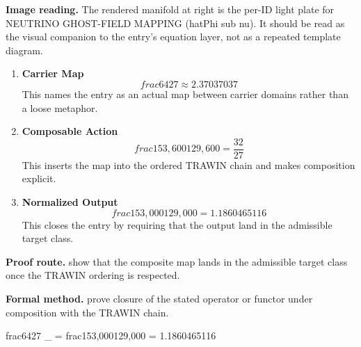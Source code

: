\begin{samepage}
\noindent\begin{minipage}[t]{0.45\linewidth}
\vspace{0pt}
\raggedright
\scriptsize\textbf{Image reading.} The rendered manifold at right is the per-ID light plate for NEUTRINO GHOST-FIELD MAPPING (hatPhi sub nu). It should be read as the visual companion to the entry's equation layer, not as a repeated template diagram.\par
\end{minipage}\hfill
\begin{minipage}[t]{0.53\linewidth}
\vspace*{-0.10in}
\raggedright
{}
\end{minipage}
\end{samepage}

\clearpage


\begin{enumerate}[leftmargin=1.6em,itemsep=9pt,topsep=6pt]
\item \textbf{Carrier Map}
\[
frac{64}{27} \approx 2.37037037
\]
This names the entry as an actual map between carrier domains rather than a loose metaphor.

\item \textbf{Composable Action}
\[
frac{153{,}600}{129{,}600} = \frac{32}{27}
\]
This inserts the map into the ordered TRAWIN chain and makes composition explicit.

\item \textbf{Normalized Output}
\[
frac{153{,}000}{129{,}000} = 1.1860465116
\]
This closes the entry by requiring that the output land in the admissible target class.
\end{enumerate}

\textbf{Proof route.} show that the composite map lands in the admissible target class once the TRAWIN ordering is respected.

\textbf{Formal method.} prove closure of the stated operator or functor under composition with the TRAWIN chain.

\medskip
{}

\begin{tzpsnapshot}
\end{tzpsnapshot}

\tzpequationlinks
  {frac{64}{27} }
  {_{} = \cdots}
  {frac{153{,}000}{129{,}000} = 1.1860465116}
